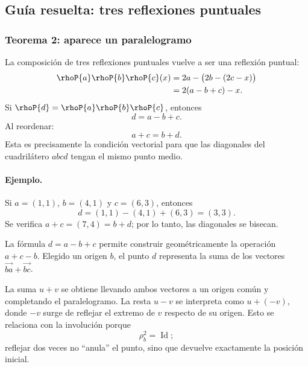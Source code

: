 \subsection{Guía resuelta: tres reflexiones puntuales}

\subsubsection{Teorema 2: aparece un paralelogramo}

La composición de tres reflexiones puntuales vuelve a ser una reflexión puntual:
\[
\begin{aligned}
\rhoP{a}\rhoP{b}\rhoP{c}(x)
  &=2a-\bigl(2b-(2c-x)\bigr)\\
  &=2(a-b+c)-x.
\end{aligned}
\]
Si \(\rhoP{d}=\rhoP{a}\rhoP{b}\rhoP{c}\), entonces
\[
  \boxed{d=a-b+c}.
\]
Al reordenar:
\[
  a+c=b+d.
\]
Esta es precisamente la condición vectorial para que las diagonales del cuadrilátero
\(a b c d\) tengan el mismo punto medio.

\begin{center}
\end{center}

\paragraph{Ejemplo.}
Si \(a=(1,1)\), \(b=(4,1)\) y \(c=(6,3)\), entonces
\[
  d=(1,1)-(4,1)+(6,3)=(3,3).
\]
Se verifica \(a+c=(7,4)=b+d\); por lo tanto, las diagonales se bisecan.

\begin{idea}
La fórmula \(d=a-b+c\) permite construir geométricamente la operación
\(a+c-b\). Elegido un origen \(b\), el punto \(d\) representa la suma de los
vectores \(\overrightarrow{ba}+\overrightarrow{bc}\).

La suma \(u+v\) se obtiene llevando ambos vectores a un origen común y completando el
paralelogramo. La resta \(u-v\) se interpreta como \(u+(-v)\), donde \(-v\) surge de reflejar
el extremo de \(v\) respecto de su origen. Esto se relaciona con la involución porque
\[
  \rho_b^2=\operatorname{Id};
\]
reflejar dos veces no ``anula'' el punto, sino que devuelve exactamente la posición inicial.
\end{idea}

